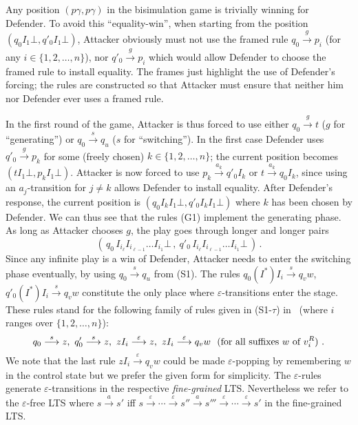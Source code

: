 \documentclass[11pt]{article}
\newcommand{\goes}[1]{\ensuremath{\stackrel{#1}{\longrightarrow}}}
\begin{document}
Any position $(p\gamma,p\gamma)$ in the bisimulation game
is trivially winning for Defender. 
To avoid this ``equality-win'', when
starting from the position $(q_0 I_1\bot, q'_0 I_1\bot)$, 
Attacker obviously must not use the framed rule $q_0\goes{g}p_i$ 
(for any $i\in\{1,2,\dots,n\}$), nor $q'_0\goes{g}p_i$ which would
allow Defender to choose the framed rule to install equality. 
The frames just highlight
the use of Defender's forcing;
the rules are constructed so that Attacker must ensure
that neither him nor Defender ever uses a framed rule.

In the first round of the game, Attacker is thus forced
to use either $q_0 \goes{g} t$ ($g$ for ``generating'')
or $q_0 \goes{s} q_u$ ($s$ for ``switching'').
In the first case Defender uses
$q'_0 \goes{g} p_k$ for some (freely chosen) 
$k\in\{1,2,\dots,n\}$;
the current position becomes $(t I_1\bot, p_k I_1\bot)$.
Attacker is now forced to use $p_k \goes{a_k} q'_0 I_k$
or $t \goes{a_k} q_0 I_k$, since using an 
$a_j$-transition for $j\neq k$ allows Defender to install equality.
After Defender's response,
the current position is 
$(q_0 I_kI_1\bot, q'_0 I_kI_1\bot)$ where $k$ has been
chosen by Defender. 
We can thus see that the rules (G1) implement the generating phase. 
As long as Attacker chooses $g$, the play goes
through longer and longer pairs
\begin{equation*}(\, q_0\, I_{i_\ell}I_{i_{\ell-1}}\ldots I_{i_1}\bot\,,
\ q'_0\, I_{i_\ell}I_{i_{\ell-1}}\ldots I_{i_1}\bot\,)\,.
\end{equation*}
Since any infinite play is a win of Defender,
Attacker needs to enter the switching phase eventually, by using 
$q_0\goes{s}q_u$ from (S1).
The rules $q_0(I^*)I_i \goes{s} q_vw$, 
$q'_0(I^*)I_i \goes{s} q_vw$ constitute the only place where
$\varepsilon$-transitions enter the stage.
These rules stand for the 
following family of rules
given in (S1-$\tau$) in~\cite{DBLP:journals/jacm/JancarS08} 
(where $i$ ranges over $\{1,2,\dots,n\}$):
\begin{equation}\label{eq:familyepsilonrules}
q_0 \goes{s} z, \
q'_0 \goes{s} z, \
z I_i \goes{\varepsilon} z, \
z I_i \goes{\varepsilon} q_v w \
\ (\textnormal{for all suffixes } w
\textnormal{ of } v_i^R)\ .
\end{equation}
We note that the last rule 
$z I_i \goes{\varepsilon} q_v w$
could be made 
$\varepsilon$-popping by remembering $w$ 
in the control state but we prefer the given form for simplicity.
The $\varepsilon$-rules generate 
$\varepsilon$-transitions
in the respective \emph{fine-grained} LTS. 
Nevertheless 
we refer to the $\varepsilon$-free LTS where 
$s\goes{a}s'$ iff $s\goes{\varepsilon}\cdots \goes{\varepsilon}
s''\goes{a}s'''\goes{\varepsilon}\cdots \goes{\varepsilon}s'$
in the fine-grained LTS.
\end{document}
